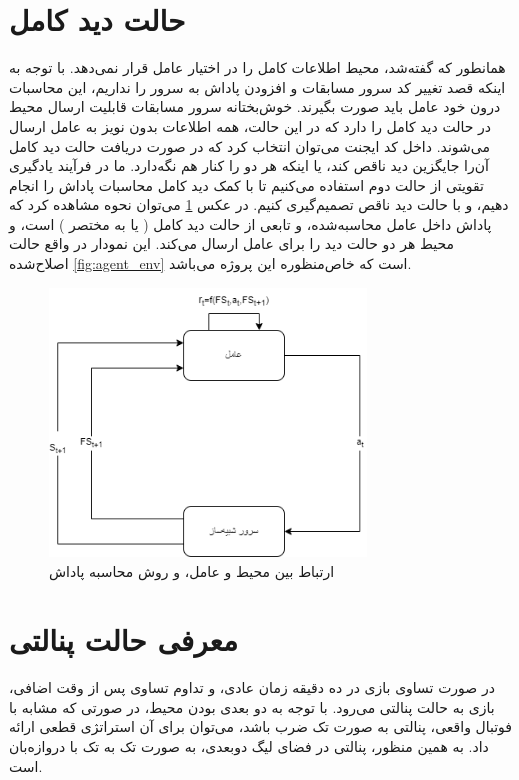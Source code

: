\section{حالت دید کامل}
همانطور که گفته‌شد، محیط اطلاعات کامل را در اختیار عامل قرار نمی‌دهد. با توجه به اینکه قصد تغییر کد سرور مسابقات و افزودن پاداش به سرور را نداریم، این محاسبات درون خود عامل باید صورت بگیرند.
خوش‌بختانه سرور مسابقات قابلیت ارسال محیط در حالت دید کامل
 را دارد که در این حالت، همه اطلاعات بدون نویز به عامل ارسال می‌شوند.
 داخل کد ایجنت می‌توان انتخاب کرد که در صورت دریافت حالت دید کامل آن‌را جایگزین دید ناقص کند، یا اینکه هر دو را کنار هم نگه‌دارد.
 ما در فرآیند یادگیری تقویتی از حالت دوم استفاده می‌کنیم تا با کمک دید کامل محاسبات پاداش را انجام دهیم، و با حالت دید ناقص تصمیم‌گیری کنیم.
در عکس \ref{fig:ss2d_rl_loop} می‌توان نحوه مشاهده کرد که پاداش داخل عامل محاسبه‌شده، و تابعی از حالت دید کامل ( یا به مختصر )
است، و محیط هر دو حالت دید را برای عامل ارسال می‌کند.
این نمودار در واقع حالت اصلاح‌شده \ref{fig:agent_env} است که خاص‌منظوره این پروژه می‌باشد.
 \begin{figure}[H]
    \centering
    \includegraphics[width=0.75\textwidth]{images/ss2d_reward.png}
    \caption{ارتباط بین محیط و عامل، و روش محاسبه پاداش}\label{fig:ss2d_rl_loop}
 \end{figure}
\section{معرفی حالت پنالتی}
در صورت تساوی بازی در ده دقیقه زمان عادی، و تداوم تساوی پس از وقت اضافی، بازی به حالت پنالتی می‌رود. 
با توجه به دو بعدی بودن محیط، در صورتی که مشابه با فوتبال واقعی، پنالتی به صورت تک ضرب باشد، می‌توان برای آن استراتژی قطعی ارائه داد.
به همین منظور، پنالتی در فضای لیگ دو‌بعدی، به صورت تک به تک با دروازه‌بان است.

